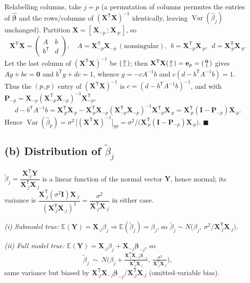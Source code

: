 \documentclass[11pt]{article}
\DeclareMathOperator{\Var}{Var}
\newcommand{\E}{\mathbb{E}}
\newcommand{\bX}{\mathbf{X}}
\newcommand{\bY}{\mathbf{Y}}
\newcommand{\bI}{\mathbf{I}}
\newcommand{\bP}{\mathbf{P}}
\newcommand{\be}{\mathbf{e}}
\newcommand{\bzero}{\mathbf{0}}
\newcommand{\bbeta}{\bm{\beta}}
\newcommand{\T}{^{\mathsf{T}}}
\newcommand{\inv}{^{-1}}
\newcommand{\bhat}[1]{\widehat{#1}}
\theoremstyle{remark}
\begin{document}
Relabelling columns, take $j=p$ (a permutation of columns permutes the entries of $\bhat{\bbeta}$ and the
rows/columns of $(\bX\T\bX)\inv$ identically, leaving $\Var(\bhat\beta_j)$ unchanged). Partition
$\bX=[\,\bX_{-p}\ \vdots\ \bX_{\cdot p}\,]$, so
\[
\bX\T\bX=\begin{pmatrix} A & b\\ b\T & d\end{pmatrix},\quad
A=\bX_{-p}\T\bX_{-p}\ (\text{nonsingular}),\ \ b=\bX_{-p}\T\bX_{\cdot p},\ \ d=\bX_{\cdot p}\T\bX_{\cdot p}.
\]
Let the last column of $(\bX\T\bX)\inv$ be $\begin{psmallmatrix}g\\ c\end{psmallmatrix}$; then
$\bX\T\bX\begin{psmallmatrix}g\\ c\end{psmallmatrix}=\be_p=\begin{psmallmatrix}\bzero\\ 1\end{psmallmatrix}$
gives $Ag+bc=\bzero$ and $b\T g+dc=1$, whence $g=-cA\inv b$ and $c(d-b\T A\inv b)=1$. Thus the $(p,p)$ entry
of $(\bX\T\bX)\inv$ is $c=(d-b\T A\inv b)\inv$, and with
$\bP_{-p}=\bX_{-p}(\bX_{-p}\T\bX_{-p})\inv\bX_{-p}\T$,
\[
d-b\T A\inv b=\bX_{\cdot p}\T\bX_{\cdot p}-\bX_{\cdot p}\T\bX_{-p}(\bX_{-p}\T\bX_{-p})\inv\bX_{-p}\T\bX_{\cdot p}
=\bX_{\cdot p}\T(\bI-\bP_{-p})\bX_{\cdot p}.
\]
Hence $\Var(\bhat\beta_p)=\sigma^2\,\big[(\bX\T\bX)\inv\big]_{pp}
=\sigma^2\big/\big(\bX_{\cdot p}\T(\bI-\bP_{-p})\bX_{\cdot p}\big)$. \hfill$\blacksquare$

\subsection*{(b) Distribution of $\widetilde\beta_j$}

$\widetilde\beta_j=\dfrac{\bX_{\cdot j}\T\bY}{\bX_{\cdot j}\T\bX_{\cdot j}}$ is a linear function of the
normal vector $\bY$, hence normal; its variance is
$\dfrac{\bX_{\cdot j}\T(\sigma^2\bI)\bX_{\cdot j}}{(\bX_{\cdot j}\T\bX_{\cdot j})^2}
=\dfrac{\sigma^2}{\bX_{\cdot j}\T\bX_{\cdot j}}$ in either case.

\emph{(i) Submodel true:} $\E(\bY)=\bX_{\cdot j}\beta_j\Rightarrow\E(\widetilde\beta_j)=\beta_j$, so
$\widetilde\beta_j\sim N\!\big(\beta_j,\ \sigma^2/\bX_{\cdot j}\T\bX_{\cdot j}\big)$.

\emph{(ii) Full model true:} $\E(\bY)=\bX_{\cdot j}\beta_j+\bX_{-j}\bbeta_{-j}$, so
\[
\widetilde\beta_j\ \sim\ N\!\Big(\beta_j+\tfrac{\bX_{\cdot j}\T\bX_{-j}\bbeta_{-j}}{\bX_{\cdot j}\T\bX_{\cdot j}},
\ \tfrac{\sigma^2}{\bX_{\cdot j}\T\bX_{\cdot j}}\Big),
\]
same variance but biased by $\bX_{\cdot j}\T\bX_{-j}\bbeta_{-j}/\bX_{\cdot j}\T\bX_{\cdot j}$
(omitted-variable bias).
\end{document}
